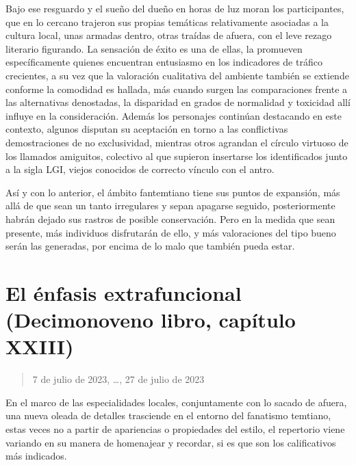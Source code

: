 \documentclass[
]{book}
\begin{document}
Bajo ese resguardo y el sueño del dueño en horas de luz moran los participantes, que en lo cercano trajeron sus propias temáticas relativamente asociadas a la cultura local, unas armadas dentro, otras traídas de afuera, con el leve rezago literario figurando. La sensación de éxito es una de ellas, la promueven específicamente quienes encuentran entusiasmo en los indicadores de tráfico crecientes, a su vez que la valoración cualitativa del ambiente también se extiende conforme la comodidad es hallada, más cuando surgen las comparaciones frente a las alternativas denostadas, la disparidad en grados de normalidad y toxicidad allí influye en la consideración. Además los personajes continúan destacando en este contexto, algunos disputan su aceptación en torno a las conflictivas demostraciones de no exclusividad, mientras otros agrandan el círculo virtuoso de los llamados amiguitos, colectivo al que supieron insertarse los identificados junto a la sigla LGI, viejos conocidos de correcto vínculo con el antro.

Así y con lo anterior, el ámbito fantemtiano tiene sus puntos de expansión, más allá de que sean un tanto irregulares y sepan apagarse seguido, posteriormente habrán dejado sus rastros de posible conservación. Pero en la medida que sean presente, más individuos disfrutarán de ello, y más valoraciones del tipo bueno serán las generadas, por encima de lo malo que también pueda estar.

\hypertarget{el-uxe9nfasis-extrafuncional-decimonoveno-libro-capuxedtulo-xxiii}{%
\section{El énfasis extrafuncional (Decimonoveno libro, capítulo XXIII)}\label{el-uxe9nfasis-extrafuncional-decimonoveno-libro-capuxedtulo-xxiii}}

\begin{quote}
7 de julio de 2023, \ldots, 27 de julio de 2023
\end{quote}

En el marco de las especialidades locales, conjuntamente con lo sacado de afuera, una nueva oleada de detalles trasciende en el entorno del fanatismo temtiano, estas veces no a partir de apariencias o propiedades del estilo, el repertorio viene variando en su manera de homenajear y recordar, si es que son los calificativos más indicados.
\end{document}
